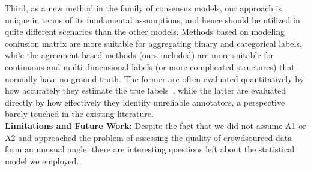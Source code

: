 \documentclass[10pt,journal,letterpaper,compsoc,twoside]{IEEEtran}
\begin{document}
{
Third, as a new method in the family of consensus models, our approach is unique in terms of its fundamental assumptions, and hence
should be utilized in quite different scenarios than the other models. Methods based on modeling confusion matrix are
more suitable for aggregating binary and categorical labels, while the agreement-based methods (ours included) are more suitable for 
continuous and multi-dimensional labels (or more complicated structures) 
that normally have no ground truth. The former are often evaluated quantitatively by
how accurately they estimate the true labels~\cite{sheshadri2013square}, while the latter are evaluated directly by
how effectively they identify unreliable annotators, a perspective barely touched in the existing literature.}\\

\noindent\textbf{Limitations and Future Work:} 
Despite the fact that we did not assume A1 or A2 and {approached the problem of assessing the quality of crowdsourced data form an unusual angle}, there are interesting questions left about the statistical model we employed.
\end{document}

